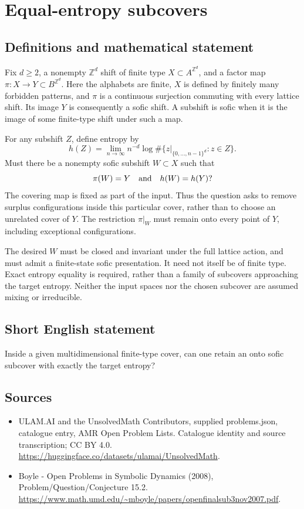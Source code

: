 \documentclass[11pt,a4paper]{article}
\begin{document}
\section*{Equal-entropy subcovers}\label{statement}

\subsection{Definitions and mathematical statement}
Fix $d\ge2$, a nonempty $\mathbb Z^d$ shift of finite type
$X\subset A^{\mathbb Z^d}$, and a factor map
$\pi:X\to Y\subset B^{\mathbb Z^d}$. Here the alphabets are finite,
$X$ is defined by finitely many forbidden patterns, and $\pi$ is a
continuous surjection commuting with every lattice shift. Its image
$Y$ is consequently a sofic shift. A subshift is sofic when it is the
image of some finite-type shift under such a map.

For any subshift $Z$, define entropy by
\[
 h(Z)=\lim_{n\to\infty}n^{-d}
   \log\#\{z|_{\{0,\ldots,n-1\}^d}:z\in Z\}.
\]
Must there be a nonempty sofic subshift $W\subset X$ such that
\[
                 \pi(W)=Y\quad\hbox{and}\quad h(W)=h(Y)?
\]
The covering map is fixed as part of the input. Thus the question asks
to remove surplus configurations inside this particular cover, rather
than to choose an unrelated cover of $Y$. The restriction $\pi|_W$
must remain onto every point of $Y$, including exceptional configurations.

The desired $W$ must be closed and invariant under the full lattice
action, and must admit a finite-state sofic presentation. It need not
itself be of finite type. Exact entropy equality is required, rather
than a family of subcovers approaching the target entropy. Neither the
input spaces nor the chosen subcover are assumed mixing or irreducible.
\subsection{Short English statement}
Inside a given multidimensional finite-type cover, can one retain an onto sofic subcover with exactly the target entropy?
\subsection{Sources}
\begin{itemize}
\item[S1] ULAM.AI and the UnsolvedMath Contributors, supplied problems.json, catalogue entry, AMR Open Problem Lists. Catalogue identity and source transcription; CC BY 4.0.
\url{https://huggingface.co/datasets/ulamai/UnsolvedMath}.
\item[S2] Boyle - Open Problems in Symbolic Dynamics (2008), Problem/Question/Conjecture 15.2. 
\url{https://www.math.umd.edu/~mboyle/papers/openfinalsub3nov2007.pdf}.
\end{itemize}
\end{document}

